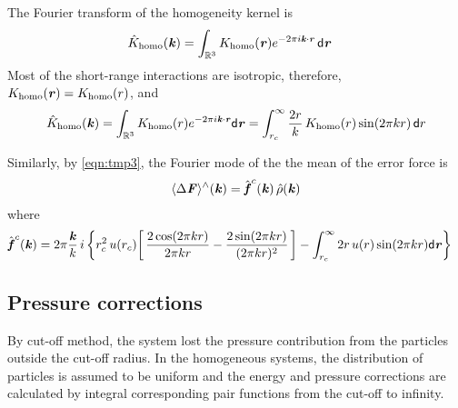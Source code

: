 \documentclass[aps,pre,preprint]{revtex4}
\renewcommand{\v}[1]{\textbf{\textit{#1}}}
\renewcommand{\d}[1]{\textsf{#1}}
\begin{document}
The Fourier transform of the homogeneity kernel is 
\begin{align}
  \hat K_{\textrm{homo}}(\v k)
  &=
  \int_{\mathbb R^3}K_{\textrm{homo}}(\v r)e^{-2\pi i\v k\cdot\v r}\,\d d\v r
\end{align}
Most of the short-range interactions are isotropic, therefore,
$K_{\textrm{homo}}(\v r) = K_{\textrm{homo}}(r)$, and
\begin{align}
  \hat{K}_{\textrm{homo}}(\v k)
  =
  \int_{\mathbb R^3}K_{\textrm{homo}}(r)e^{-2\pi i\v k\cdot\v r}\d d\v r
  =
  \int_{r_c}^\infty \frac{2 r}k\, K_{\textrm{homo}}(r) \sin(2\pi kr)\,\d dr
\end{align}


Similarly, by \eqref{eqn:tmp3}, the Fourier mode of the the mean of
the error force is
\begin{align}
  \langle\Delta\v F\rangle^\wedge(\v k) =
  \hat{\v f}^c(\v k)\,
  \hat\rho(\v k)
\end{align}
where 
\begin{align}\label{eqn:tmp18}
  \hat{\v f}^c(\v k) 
  & = 
  2\pi\frac{\v k}k\, i\,
  \bigg\{
  r_c^2\,u(r_c)
  \bigg[\,
  \frac{2\cos(2\pi kr)}{2\pi kr}
  -\frac{2\sin(2\pi kr)}{(2\pi kr)^2}
  \,\bigg] 
  -
  \int_{r_c}^\infty 2r\,u(r)\sin(2\pi kr)\d d\v r
  \bigg\}
\end{align}


\subsection{Pressure corrections}
By cut-off method, the system lost the  pressure
contribution from the particles outside the cut-off radius.  In the
homogeneous systems, the distribution of particles is assumed to be
uniform and the energy and pressure corrections are calculated by
integral corresponding pair functions from the cut-off to infinity.
\end{document}
